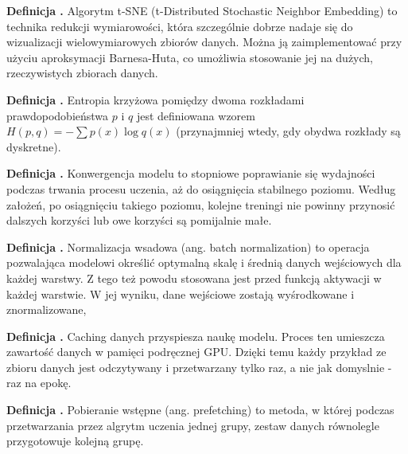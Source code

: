 \noindent
\textbf{Definicja .}
\incrementdefinitionIndex
Algorytm t-SNE (t-Distributed Stochastic Neighbor Embedding) to technika redukcji wymiarowości,
która szczególnie dobrze nadaje się do wizualizacji wielowymiarowych zbiorów danych.
Można ją zaimplementować przy użyciu aproksymacji Barnesa-Huta,
co umożliwia stosowanie jej na dużych, rzeczywistych zbiorach danych.

\noindent
\textbf{Definicja .}
\incrementdefinitionIndex
Entropia krzyżowa pomiędzy dwoma rozkładami prawdopodobieństwa $p$ i $q$ jest definiowana wzorem
$H(p,q) = -\sum p(x) \log q(x) $ (przynajmniej wtedy, gdy obydwa rozkłady są dyskretne).

\noindent
\textbf{Definicja .}
\incrementdefinitionIndex
Konwergencja modelu to stopniowe poprawianie się wydajności podczas trwania procesu uczenia,
aż do osiągnięcia stabilnego poziomu. Według założeń, po osiągnięciu takiego poziomu,
kolejne treningi nie powinny przynosić dalszych korzyści lub owe korzyści są pomijalnie małe.

\noindent
\textbf{Definicja .}
\incrementdefinitionIndex
Normalizacja wsadowa (ang. batch normalization) to operacja pozwalająca modelowi określić optymalną skalę
i średnią danych wejściowych dla każdej warstwy.
Z tego też powodu stosowana jest przed funkcją aktywacji w każdej warstwie.
W jej wyniku, dane wejściowe zostają wyśrodkowane i znormalizowane,

\noindent
\textbf{Definicja .}
\incrementdefinitionIndex
Caching danych przyspiesza naukę modelu. Proces ten umieszcza zawartość danych w pamięci podręcznej GPU.
Dzięki temu każdy przykład ze zbioru danych jest odczytywany i przetwarzany tylko raz, a nie jak domyslnie - raz na epokę.

\noindent
\textbf{Definicja .}
\incrementdefinitionIndex
Pobieranie wstępne (ang. prefetching) to metoda, w której podczas przetwarzania przez algrytm uczenia jednej grupy,
zestaw danych równolegle przygotowuje kolejną grupę.